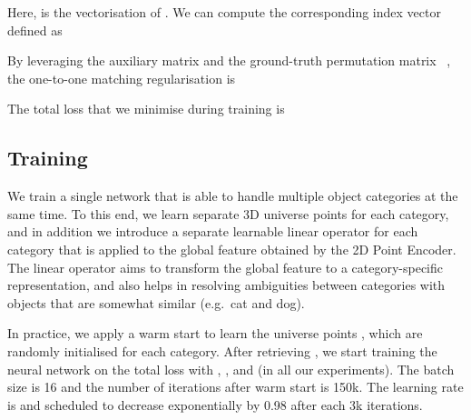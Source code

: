 Here,  is the vectorisation of .
We can compute the corresponding index vector  defined as

By leveraging the auxiliary matrix   and the ground-truth permutation matrix ~\cite{wang2018abpf}, the one-to-one matching regularisation is 

The total loss that we minimise during training is 




\subsection{Training}
We train a single network that is able to handle multiple object categories at the same time. To this end, we learn separate 3D universe points for each category, and in addition  we introduce a separate learnable linear operator for each category that is applied to the global feature obtained by the 2D Point Encoder. The linear operator aims to transform the global feature to a category-specific representation, and also helps in resolving ambiguities between categories with objects that are somewhat similar (e.g.~cat and dog).

In practice, we apply a warm start to learn the universe points , which are randomly initialised for each category. 
After retrieving , we start training the neural network on the total loss with , ,  and  (in all our experiments).
The batch size  is 16 and the number of iterations after warm start is 150k. 
The learning rate is  and scheduled to decrease exponentially by 0.98 after each 3k iterations.